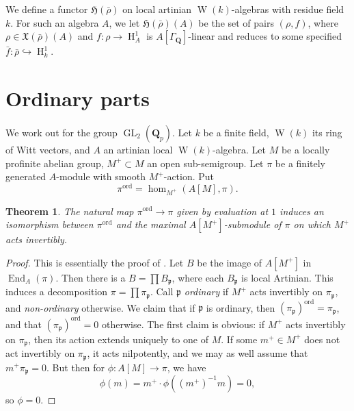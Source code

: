 \documentclass{article}
\DeclareMathOperator{\End}{End}
\DeclareMathOperator{\GL}{GL}
\DeclareMathOperator{\h}{H}
\DeclareMathOperator{\witt}{W}
\newcommand{\dQ}{\mathbf{Q}}
\newcommand{\fp}{\mathfrak{p}}
\newcommand{\fH}{\mathfrak{H}}
\newcommand{\fX}{\mathfrak{X}}
\newcommand{\ordinary}{\mathrm{ord}}
\newtheorem{theorem}[subsection]{Theorem}
\begin{document}
We define a functor  
$\fH(\bar\rho)$ on local artinian $\witt(k)$-algebras with residue field $k$. 
For such an algebra $A$, we let $\fH(\bar\rho)(A)$ be the set of pairs 
$(\rho,f)$, where $\rho\in \fX(\bar\rho)(A)$ and $f:\rho\to \h^1_A$ is 
$A[\Gamma_\dQ]$-linear and reduces to some specified 
$\bar f:\bar\rho\hookrightarrow \h_k^1$. 





\section{Ordinary parts}

We work out \cite{emerton-2010-i,emerton-2010-ii} for the group $\GL_2(\dQ_p)$. 
Let $k$ be a finite field, $\witt(k)$ its ring of Witt vectors, and $A$ an 
artinian local $\witt(k)$-algebra. Let $M$ be a locally profinite abelian 
group, $M^+\subset M$ an open sub-semigroup. Let $\pi$ be a finitely generated 
$A$-module with smooth $M^+$-action. Put 
\[
  \pi^\ordinary = \hom_{M^+}(A[M],\pi) .
\]

\begin{theorem}
The natural map $\pi^\ordinary\to \pi$ given by evaluation at $1$ induces an 
isomorphism between $\pi^\ordinary$ and the maximal $A[M^+]$-submodule of 
$\pi$ on which $M^+$ acts invertibly. 
\end{theorem}
\begin{proof}
This is essentially the proof of \cite[3.1.5]{emerton-2010-i}. 
Let $B$ be the image of $A[M^+]$ in $\End_A(\pi)$. Then there is a 
$B=\prod B_\fp$, where each $B_\fp$ is local Artinian. This induces a 
decomposition $\pi=\prod \pi_\fp$. Call $\fp$ \emph{ordinary} if 
$M^+$ acts invertibly on $\pi_\fp$, and \emph{non-ordinary} otherwise. We claim 
that if $\fp$ is ordinary, then $(\pi_\fp)^\ordinary=\pi_\fp$, and that 
$(\pi_\fp)^\ordinary=0$ otherwise. The first claim is obvious: if 
$M^+$ acts invertibly on $\pi_\fp$, then its action extends uniquely to one of 
$M$. If some $m^+\in M^+$ does not act invertibly on $\pi_\fp$, it acts 
nilpotently, and we may as well assume that $m^+ \pi_\fp=0$. But then for 
$\phi:A[M]\to \pi$, we have 
\[
  \phi(m) = m^+\cdot \phi\left((m^+)^{-1} m\right) = 0,
\]
so $\phi=0$. 
\end{proof}
\end{document}

